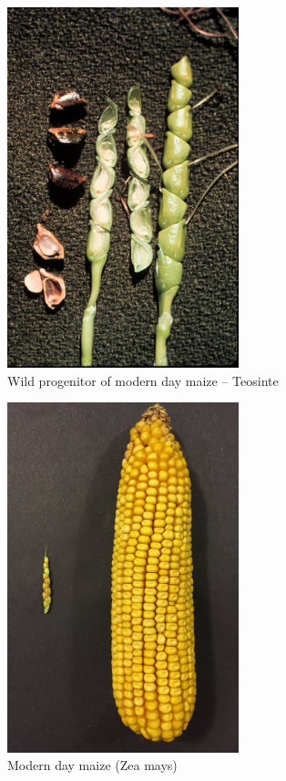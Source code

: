 \documentclass[11pt,ignorenonframetext,aspectratio=169]{beamer}
\begin{document}
\begin{frame}{}
\protect\hypertarget{section-10}{}
\begin{figure}
\includegraphics[width=0.6\textwidth, keepaspectratio,height=0.45\textheight]{./images/Teosinte} \caption{Wild progenitor of modern day maize -- Teosinte}\label{fig:maize-ancestor-teosinte}
\end{figure}

\begin{figure}
\includegraphics[width=0.6\textwidth, keepaspectratio,height=0.45\textheight]{./images/Teosinte_maize} \caption{Modern day maize (Zea mays)}\label{fig:maize-modern}
\end{figure}
\end{frame}
\end{document}
